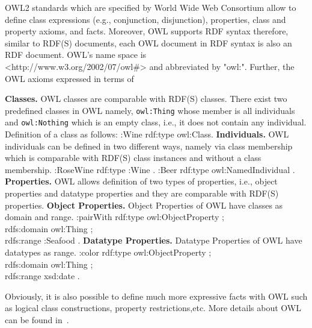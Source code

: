OWL2 standards which are specified by World Wide Web Consortium allow to define class expressions (e.g., conjunction, disjunction), properties, class and property axioms, and facts. Moreover, OWL supports RDF syntax therefore, similar to RDF(S) documents, each OWL document in RDF syntax is also an RDF document. OWL's name space is \\<http://www.w3.org/2002/07/owl\#> and abbreviated by "owl:". Further, the OWL axioms expressed in terms of 
\begin{outline}
\1 \textbf{Classes.} OWL classes are comparable with RDF(S) classes. There exist two predefined classes in OWL namely, \texttt{owl:Thing} whose member is all individuals and \texttt{owl:Nothing} which is an empty class, i.e., it does not contain any individual. Definition of a class as follows: 
    \2 :Wine rdf:type owl:Class.  
 \1 \textbf{Individuals.} OWL individuals can be defined in two different ways, namely via class membership which is comparable with RDF(S) class instances and without a class membership.
\2 :RoseWine rdf:type :Wine .
\2 :Beer rdf:type owl:NamedIndividual .
\1 \textbf{Properties.} OWL allows definition of two types of properties, i.e., object properties and datatype properties and they are comparable with RDF(S) properties. 
\2 \textbf{Object Properties.} Object Properties of OWL have classes as domain and range.
\3 :pairWith rdf:type owl:ObjectProperty ;\\
\hspace{2cm}          rdfs:domain owl:Thing ;\\
        rdfs:range  :Seafood .
\2 \textbf{Datatype Properties.} Datatype Properties of OWL have datatypes as range.
\3 :color rdf:type owl:ObjectProperty ;\\
\hspace*{1.cm}rdfs:domain owl:Thing ;\\
\hspace*{1cm}rdfs:range  xsd:date . 
\end{outline} 
\noindent Obviously, it is also possible to define much more expressive facts with OWL such as logical class constructions, property restrictions,etc. More details about OWL can be found  in~\cite{DBLP:books/crc/Hitzler2010}.
